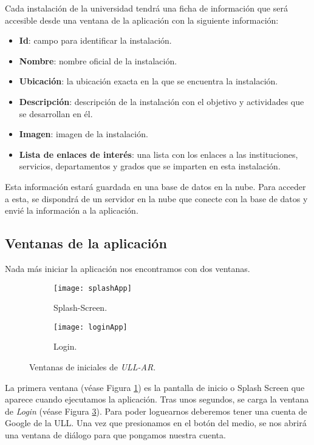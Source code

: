 Cada instalación de la universidad tendrá una ficha de información que será accesible desde una ventana de la aplicación con la siguiente información:

\begin{itemize}
    \item \textbf{Id}: campo para identificar la instalación.
    \item \textbf{Nombre}: nombre oficial de la instalación.
    \item \textbf{Ubicación}: la ubicación exacta en la que se encuentra la instalación. 
    \item \textbf{Descripción}: descripción de la instalación con el objetivo y actividades que se desarrollan en él.
    \item \textbf{Imagen}: imagen de la instalación.
    \item \textbf{Lista de enlaces de interés}: una lista con los enlaces a las instituciones, servicios, departamentos y grados que se imparten en esta instalación.
\end{itemize}

Esta información estará guardada en una base de datos en la nube. Para acceder a esta, se dispondrá de un servidor en la nube que conecte con la base de datos y envié la información a la aplicación.

\subsection{Ventanas de la aplicación}

Nada más iniciar la aplicación nos encontramos con dos ventanas.

\begin{figure}[h]
\hspace*{\fill}%
\begin{subfigure}[h]{0.32\linewidth}
\texttt{[image: splashApp]}
\caption{Splash-Screen.}
\label{fig:splashApp}
\end{subfigure}
\hfill%
\begin{subfigure}[h]{0.32\linewidth}
\texttt{[image: loginApp]}
\caption{Login.}
\label{fig:loginApp} 
\end{subfigure}%
\caption{Ventanas de iniciales de \textit{ULL-AR}.}
\hspace*{\fill}%
\end{figure}
  
La primera ventana (véase Figura \ref{fig:splashApp}) es la pantalla de inicio o Splash Screen que aparece cuando ejecutamos la aplicación. Tras unos segundos, se carga la ventana de \textit{Login} (véase Figura \ref{fig:loginApp}). Para poder loguearnos deberemos tener una cuenta de Google de la ULL. Una vez que presionamos en el botón del medio, se nos abrirá una ventana de diálogo para que pongamos nuestra cuenta.

